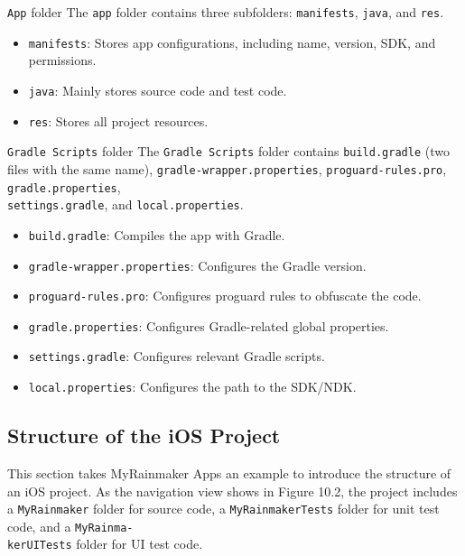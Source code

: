 \documentclass[a4paper,12pt]{book}
\begin{document}
\begin{term}{\texttt{App} folder}
    The \verb|app| folder contains three subfolders: \verb|manifests|, \verb|java|, and \verb|res|.
    \begin{itemize}
        \item \verb|manifests|: Stores app configurations, including name, version, SDK, and permissions.
        \item \verb|java|: Mainly stores source code and test code.
        \item \verb|res|: Stores all project resources.
    \end{itemize}
\end{term}

\begin{term}{\texttt{Gradle Scripts} folder}
    The \verb|Gradle Scripts| folder contains \verb|build.gradle| (two files with the same name), \verb|gradle-wrapper.properties|, \verb|proguard-rules.pro|, \verb|gradle.properties|, \\ \verb|settings.gradle|, and \verb|local.properties|.
    \vspace{6pt}
    \begin{itemize}
        \item \verb|build.gradle|: Compiles the app with Gradle.
        \item \verb|gradle-wrapper.properties|: Configures the Gradle version.
        \item \verb|proguard-rules.pro|: Configures proguard rules to obfuscate the code.
        \item \verb|gradle.properties|: Configures Gradle-related global properties.
        \item \verb|settings.gradle|: Configures relevant Gradle scripts.
        \item \verb|local.properties|: Configures the path to the SDK/NDK.
    \end{itemize}
\end{term}

\subsection{Structure of the iOS Project}
This section takes MyRainmaker Apps an example to introduce the structure of an iOS project. As the navigation view shows in Figure 10.2, the project includes a \verb|MyRainmaker| folder for source code, a \verb|MyRainmakerTests| folder for unit test code, and a \verb|MyRainma-|\\
\verb|kerUITests| folder for UI test code.
\end{document}
